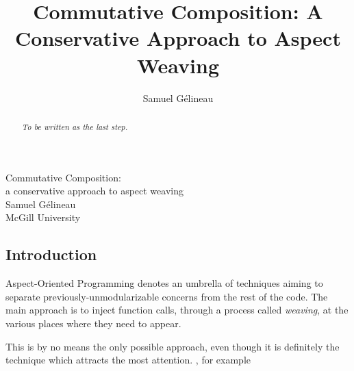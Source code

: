 \documentclass{article}
\title{Commutative Composition: A Conservative Approach to Aspect Weaving}
\author{Samuel G\'elineau}
\begin{document}
\begin{center}
{\larger[3] Commutative Composition:}\\
{\larger[2] a conservative approach to aspect weaving}\\
\vspace{\bigskipamount}
{\larger Samuel G\'elineau}\\
McGill University
\end{center}

\begin{abstract}\em
To be written as the last step.
\end{abstract}

\begin{multicols}{2}
\section{Introduction}\label{intro}
\vspace{-\parskip}\hspace*{\parindent}
Aspect-Oriented Programming denotes an umbrella of techniques aiming to separate previously-unmodularizable concerns from the rest of the code. The main approach is to inject function calls, through a process called \emph{weaving}, at the various places where they need to appear.

This is by no means the only possible approach, even though it is definitely the technique which attracts the most attention. \cite{bar}, for example

\end{multicols}


\end{document}
